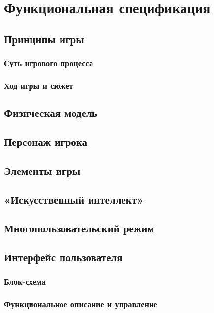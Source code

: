 \documentclass{article}
\begin{document}
\section{Функциональная спецификация}
\subsection{Принципы игры}
\subsubsection{Суть игрового процесса}

\subsubsection{Ход игры и сюжет}

\subsection{Физическая модель}
\subsection{Персонаж игрока}

\subsection{Элементы игры}

\subsection{«Искусственный интеллект»}

\subsection{Многопользовательский режим}


\subsection{Интерфейс пользователя}
\subsubsection{Блок-схема}


\subsubsection{Функциональное описание и управление}
\end{document}
